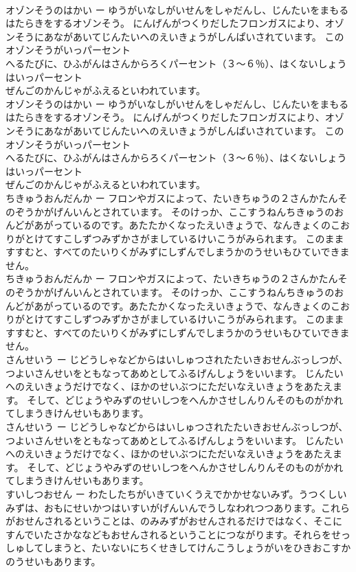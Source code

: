 \documentclass[8pt]{extreport}
\begin{document}
\begin{CJK}{UTF8}{min}
\\	オゾンそうのはかい ー ゆうがいなしがいせんをしゃだんし、じんたいをまもるはたらきをするオゾンそう。 にんげんがつくりだしたフロンガスにより、オゾンそうにあながあいてじんたいへのえいきょうがしんぱいされています。 このオゾンそうがいっパーセント
\\	へるたびに、ひふがんはさんからろくパーセント（３〜６％）、はくないしょうはいっパーセント
\\	ぜんごのかんじゃがふえるといわれています。
\\	オゾンそうのはかい ー ゆうがいなしがいせんをしゃだんし、じんたいをまもるはたらきをするオゾンそう。 にんげんがつくりだしたフロンガスにより、オゾンそうにあながあいてじんたいへのえいきょうがしんぱいされています。 このオゾンそうがいっパーセント
\\	へるたびに、ひふがんはさんからろくパーセント（３〜６％）、はくないしょうはいっパーセント
\\	ぜんごのかんじゃがふえるといわれています。
\\	ちきゅうおんだんか ー フロンやガスによって、たいきちゅうの２さんかたんそのぞうかがげんいんとされています。 そのけっか、ここすうねんちきゅうのおんどがあがっているのです。あたたかくなったえいきょうで、なんきょくのこおりがとけてすこしずつみずかさがましているけいこうがみられます。 このまますすむと、すべてのたいりくがみずにしずんでしまうかのうせいもひていできません。
\\	ちきゅうおんだんか ー フロンやガスによって、たいきちゅうの２さんかたんそのぞうかがげんいんとされています。 そのけっか、ここすうねんちきゅうのおんどがあがっているのです。あたたかくなったえいきょうで、なんきょくのこおりがとけてすこしずつみずかさがましているけいこうがみられます。 このまますすむと、すべてのたいりくがみずにしずんでしまうかのうせいもひていできません。
\\	さんせいう ー じどうしゃなどからはいしゅつされたたいきおせんぶっしつが、つよいさんせいをともなってあめとしてふるげんしょうをいいます。 じんたいへのえいきょうだけでなく、ほかのせいぶつにただいなえいきょうをあたえます。 そして、どじょうやみずのせいしつをへんかさせしんりんそのものがかれてしまうきけんせいもあります。
\\	さんせいう ー じどうしゃなどからはいしゅつされたたいきおせんぶっしつが、つよいさんせいをともなってあめとしてふるげんしょうをいいます。 じんたいへのえいきょうだけでなく、ほかのせいぶつにただいなえいきょうをあたえます。 そして、どじょうやみずのせいしつをへんかさせしんりんそのものがかれてしまうきけんせいもあります。
\\	すいしつおせん ー わたしたちがいきていくうえでかかせないみず。うつくしいみずは、おもにせいかつはいすいがげんいんでうしなわれつつあります。これらがおせんされるということは、のみみずがおせんされるだけではなく、そこにすんでいたさかななどもおせんされるということにつながります。それらをせっしゅしてしまうと、たいないにちくせきしてけんこうしょうがいをひきおこすかのうせいもあります。

\end{CJK}
\end{document}
